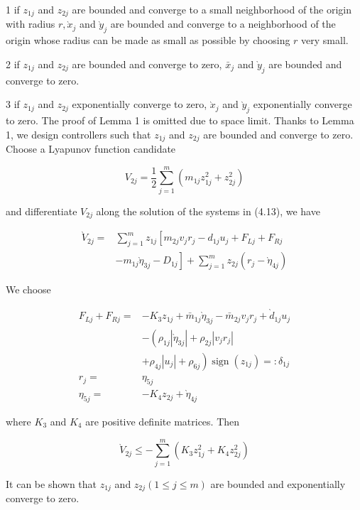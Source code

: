 \documentclass[10pt]{article}
\begin{document}
1 if $z_{1 j}$ and $z_{2 j}$ are bounded and converge to a small neighborhood of the origin with radius $r, \grave{x}_{j}$ and $\grave{y}_{j}$ are bounded and converge to a neighborhood of the origin whose radius can be made as small as possible by choosing $r$ very small.

2 if $z_{1 j}$ and $z_{2 j}$ are bounded and converge to zero, $\bar{x}_{j}$ and $\grave{y}_{j}$ are bounded and converge to zero.

3 if $z_{1 j}$ and $z_{2 j}$ exponentially converge to zero, $\grave{x}_{j}$ and $\grave{y}_{j}$ exponentially converge to zero. The proof of Lemma 1 is omitted due to space limit. Thanks to Lemma 1, we design controllers such that $z_{1 j}$ and $z_{2 j}$ are bounded and converge to zero. Choose a Lyapunov function candidate

$$
V_{2 j}=\frac{1}{2} \sum_{j=1}^{m}\left(m_{1 j} z_{1 j}^{2}+z_{2 j}^{2}\right)
$$

and differentiate $V_{2 j}$ along the solution of the systems in (4.13), we have

$$
\begin{aligned}
\grave{V}_{2 j}= & \sum_{j=1}^{m} z_{1 j}\left[m_{2 j} v_{j} r_{j}-d_{1 j} u_{j}+F_{L j}+F_{R j}\right. \\
& \left.-m_{1 j} \grave{\eta}_{3 j}-D_{1 j}\right]+\sum_{j=1}^{m} z_{2 j}\left(r_{j}-\grave{\eta}_{4 j}\right)
\end{aligned}
$$

We choose

$$
\begin{aligned}
F_{L j}+F_{R j}= & -K_{3} z_{1 j}+\bar{m}_{1 j} \grave{\eta}_{3 j}-\bar{m}_{2 j} v_{j} r_{j}+\grave{d}_{1 j} u_{j} \\
& -\left(\rho_{1 j}\left|\grave{\eta}_{3 j}\right|+\rho_{2 j}\left|v_{j} r_{j}\right|\right. \\
& \left.+\rho_{4 j}\left|u_{j}\right|+\rho_{6 j}\right) \operatorname{sign}\left(z_{1 j}\right)=: \delta_{1 j} \\
r_{j}= & \eta_{5 j} \\
\eta_{5 j}= & -K_{4} z_{2 j}+\grave{\eta}_{4 j}
\end{aligned}
$$

where $K_{3}$ and $K_{4}$ are positive definite matrices. Then

$$
\grave{V}_{2 j} \leq-\sum_{j=1}^{m}\left(K_{3} z_{1 j}^{2}+K_{4} z_{2 j}^{2}\right)
$$

It can be shown that $z_{1 j}$ and $z_{2 j}(1 \leq j \leq m)$ are bounded and exponentially converge to zero.
\end{document}
